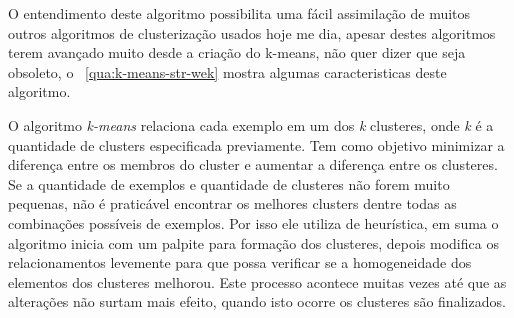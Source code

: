  O entendimento deste algoritmo possibilita uma fácil assimilação de  muitos outros algoritmos de clusterização usados hoje me dia,
 apesar destes algoritmos terem avançado muito desde a criação do k-means, não quer dizer que seja obsoleto,  
 o ~\autoref{qua:k-means-str-wek} mostra algumas caracteristicas deste algoritmo.

 O algoritmo \textit{k-means} relaciona cada exemplo em um dos \textit{k} clusteres, onde \textit{k} é a quantidade de clusters 
 especificada previamente. Tem como objetivo minimizar a diferença entre os membros do cluster e aumentar a diferença entre os clusteres.
 Se a quantidade de exemplos e quantidade de clusteres não forem muito pequenas, não é praticável encontrar os melhores clusters dentre 
 todas as combinações possíveis de exemplos. Por isso ele utiliza de heurística, em suma o algoritmo inicia com um palpite para 
 formação dos clusteres, depois modifica os relacionamentos levemente para que possa verificar se a homogeneidade dos elementos
 dos clusteres melhorou. Este processo acontece muitas vezes até que as alterações não surtam mais efeito, quando isto ocorre os
 clusteres são finalizados. 
 
 \begin{figure}[ht!]
	\centering
\end{figure}
\begin{figure}[ht!]
	\centering
\end{figure}

